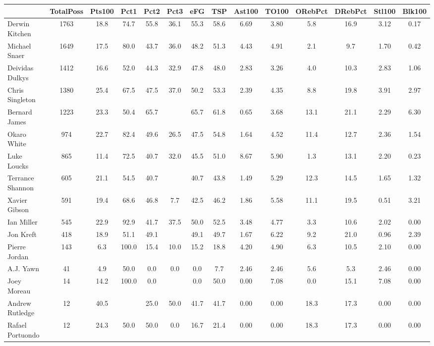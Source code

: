 \documentclass[10pt,letterpaper]{article}
\begin{document}
\begin{table}[ht]
\begin{center}
\begin{tabular}{lccccccccccccc}
  \hline
 & TotalPoss & Pts100 & Pct1 & Pct2 & Pct3 & eFG & TSP & Ast100 & TO100 & ORebPct & DRebPct & Stl100 & Blk100 \\ 
  \hline
Derwin Kitchen & 1763 & 18.8 & 74.7 & 55.8 & 36.1 & 55.3 & 58.6 & 6.69 & 3.80 & 5.8 & 16.9 & 3.12 & 0.17 \\ 
  Michael Snaer & 1649 & 17.5 & 80.0 & 43.7 & 36.0 & 48.2 & 51.3 & 4.43 & 4.91 & 2.1 & 9.7 & 1.70 & 0.42 \\ 
  Deividas Dulkys & 1412 & 16.6 & 52.0 & 44.3 & 32.9 & 47.8 & 48.0 & 2.83 & 3.26 & 4.0 & 10.3 & 2.83 & 1.06 \\ 
  Chris Singleton & 1380 & 25.4 & 67.5 & 47.5 & 37.0 & 50.2 & 53.3 & 2.39 & 4.35 & 8.8 & 19.8 & 3.91 & 2.97 \\ 
  Bernard James & 1223 & 23.3 & 50.4 & 65.7 &  & 65.7 & 61.8 & 0.65 & 3.68 & 13.1 & 21.1 & 2.29 & 6.30 \\ 
  Okaro White & 974 & 22.7 & 82.4 & 49.6 & 26.5 & 47.5 & 54.8 & 1.64 & 4.52 & 11.4 & 12.7 & 2.36 & 1.54 \\ 
  Luke Loucks & 865 & 11.4 & 72.5 & 40.7 & 32.0 & 45.5 & 51.0 & 8.67 & 5.90 & 1.3 & 13.1 & 2.20 & 0.23 \\ 
  Terrance Shannon & 605 & 21.1 & 54.5 & 40.7 &  & 40.7 & 43.8 & 1.49 & 5.29 & 12.3 & 14.5 & 1.65 & 1.32 \\ 
  Xavier Gibson & 591 & 19.4 & 68.6 & 46.8 & 7.7 & 42.5 & 46.2 & 1.86 & 5.58 & 11.1 & 19.5 & 0.51 & 3.21 \\ 
  Ian Miller & 545 & 22.9 & 92.9 & 41.7 & 37.5 & 50.0 & 52.5 & 3.48 & 4.77 & 3.3 & 10.6 & 2.02 & 0.00 \\ 
  Jon Kreft & 418 & 18.9 & 51.1 & 49.1 &  & 49.1 & 49.7 & 1.67 & 6.22 & 9.2 & 21.0 & 0.96 & 2.39 \\ 
  Pierre Jordan & 143 & 6.3 & 100.0 & 15.4 & 10.0 & 15.2 & 18.8 & 4.20 & 4.90 & 6.3 & 10.5 & 2.10 & 0.00 \\ 
  A.J. Yawn & 41 & 4.9 & 50.0 & 0.0 & 0.0 & 0.0 & 7.7 & 2.46 & 2.46 & 5.6 & 5.3 & 2.46 & 0.00 \\ 
  Joey Moreau & 14 & 14.2 & 100.0 & 0.0 &  & 0.0 & 50.0 & 0.00 & 7.08 & 0.0 & 15.1 & 7.08 & 0.00 \\ 
  Andrew Rutledge & 12 & 40.5 &  & 25.0 & 50.0 & 41.7 & 41.7 & 0.00 & 0.00 & 18.3 & 17.3 & 0.00 & 0.00 \\ 
  Rafael Portuondo & 12 & 24.3 & 50.0 & 50.0 & 0.0 & 16.7 & 21.4 & 0.00 & 0.00 & 18.3 & 17.3 & 0.00 & 0.00 \\ 
   \hline
\end{tabular}
\end{center}
\end{table}
\end{document}
